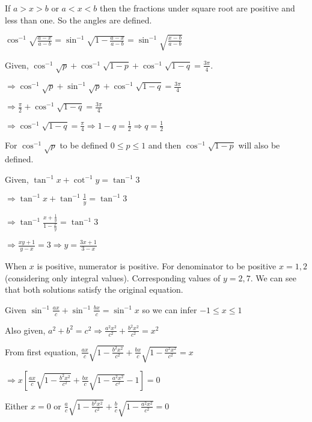 \item If $a>x>b$ or $a<x<b$ then the fractions under square root are positive and less than one. So the angles are
  defined.

  $\cos^{-1}\sqrt{\frac{a - x}{a - b}} = \sin^{-1}\sqrt{1 - \frac{a - x}{a - b}} = \sin^{-1}\sqrt{\frac{x - b}{a - b}}$

\item Given, $\cos^{-1}\sqrt{p} + \cos^{-1}\sqrt{1 - p} + \cos^{-1}\sqrt{1 - q} = \frac{3\pi}{4}$.

  $\Rightarrow \cos^{-1}\sqrt{p} + \sin^{-1}\sqrt{p} + \cos^{-1}\sqrt{1 - q} = \frac{3\pi}{4}$

  $\Rightarrow \frac{\pi}{2} + \cos^{-1}\sqrt{1 - q} = \frac{3\pi}{4}$

  $\Rightarrow \cos^{-1}\sqrt{1 - q} = \frac{\pi}{4}\Rightarrow 1 - q = \frac{1}{2} \Rightarrow q = \frac{1}{2}$

  For $\cos^{-1}\sqrt{p}$ to be defined $0\leq p\leq 1$ and then $\cos^{-1}\sqrt{1 - p}$ will also be defined.

\item Given, $\tan^{-1}x + \cot^{-1}y = \tan^{-1}3$

  $\Rightarrow \tan^{-1}x + \tan^{-1}\frac{1}{y} = \tan^{-1}3$

  $\Rightarrow \tan^{-1}\frac{x + \frac{1}{y}}{1 - \frac{x}{y}} = \tan^{-1}3$

  $\Rightarrow \frac{xy + 1}{y - x} = 3 \Rightarrow y = \frac{3x + 1}{3 - x}$

  When $x$ is positive, numerator is positive. For denominator to be positive $x = 1, 2$ (considering only integral
  values). Corresponding values of $y = 2, 7$. We can see that both solutions satisfy the original equation.

\item Given $\sin^{-1}\frac{ax}{c} + \sin^{-1}\frac{bx}{c} = \sin^{-1}x$ so we can infer $-1\leq x\leq 1$

  Also given, $a^2 + b^2 = c^2 \Rightarrow \frac{a^2x^2}{c^2} + \frac{b^2x^2}{c^2} = x^2$

  From first equation, $\frac{ax}{c}\sqrt{1 - \frac{b^2x^2}{c^2}} + \frac{bx}{c}\sqrt{1 - \frac{a^2x^2}{c^2}} = x$

  $\Rightarrow x\left[\frac{ax}{c}\sqrt{1 - \frac{b^2x^2}{c^2}} + \frac{bx}{c}\sqrt{1 - \frac{a^2x^2}{c^2}} - 1\right] = 0$

  Either $x = 0$ or $\frac{a}{c}\sqrt{1 - \frac{b^2x^2}{c^2}} + \frac{b}{c}\sqrt{1 - \frac{a^2x^2}{c^2}} = 0$

